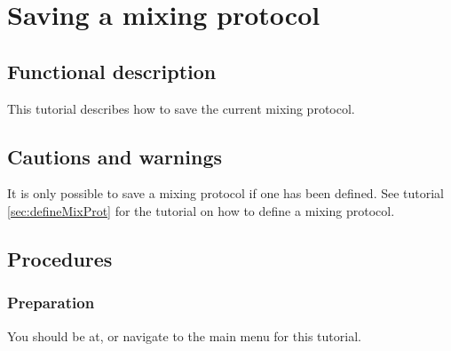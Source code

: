 

\section{Saving a mixing protocol}
\label{sec:savmixprot}

\subsection{Functional description}
This tutorial describes how to save the current mixing protocol.

\subsection{Cautions and warnings}
It is only possible to save a mixing protocol if one has been defined. See tutorial \ref{sec:defineMixProt} for the tutorial on how to define a mixing protocol.

\subsection{Procedures}

\subsubsection{Preparation}
You should be at, or navigate to the main menu for this tutorial.

